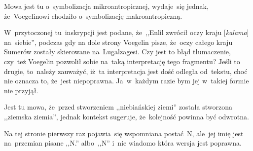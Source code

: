 \documentclass[a4paper,11pt]{article}
\begin{document}










\noi {}

\vspace{\spaceFour}

\start {} Mowa jest tu o~symbolizacja mikroantropicznej,
wydaje~się jednak, że~Voegelinowi chodziło o~symbolizację
makroantropiczną.

\vspace{\spaceFour}


\start {} W~przytoczonej tu~inskrypcji jest podane, że~,,Enlil
zwrócił oczy kraju [\emph{kalama}] na~siebie'', podczas gdy na dole
strony Voegelin pisze, że~oczy całego kraju Sumerów zostały skierowane
na~Lugalzagesi. Czy jest to błąd tłumaczenie, czy~też Voegelin
pozwolił sobie na~taką interpretację tego fragmentu? Jeśli to drugie,
to~należy zauważyć, iż~ta interpretacja jest dość odległa od~tekstu,
choć nie oznacza to, że~jest niepoprawna. Ja~w~każdym razie bym jej
w~takiej formie nie przyjął.

\vspace{\spaceFour}


\start {} Jest tu mowa, że~przed stworzeniem ,,niebiańskiej
ziemi'' została stworzona ,,ziemska ziemia'', jednak kontekst
sugeruje, że~kolejność powinna być odwrotna.

\vspace{\spaceFour}


\start {} Na tej stronie pierwszy raz pojawia~się wspomniana
postać~N, ale~jej imię jest na~przemian pisane ,,N.'' albo~,,N'' i~nie
wiadomo która wersja jest poprawna.

\vspace{\spaceFour}
\end{document}
